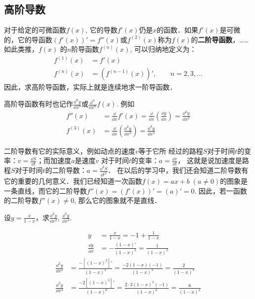 \subsection{高阶导数}
对于给定的可微函数$f(x)$, 它的导数$f'(x)$仍是$x$的函数．如果$f'(x)$是可微的，它的导函数$(f'(x))'=f''(x)$或$f^{(2)}(x)$称为$f(x)$的\textbf{二阶导函数}，……如此类推，$f(x)$
的$n$阶导函数$f^{(n)}(x)$, 可以归纳地定义为：
\begin{align*}
  f ^{(1)} (x)&=f'(x)\\
  f ^{(n)} (x)&=\left(f^{(n-1)}(x)\right)',\qquad n=2,3,\ldots  
\end{align*}
因此，求高阶导函数，实际上就是连续地求一阶导函数．

高阶导函数有时也记作$\frac{\dd^n y}{\dd x^n}$或$\frac{\dd^n }{\dd x^n}f(x)$. 例如
\begin{align*}
    f''(x)&=\frac{\dd}{\dd x}f'(x)=\frac{\dd}{\dd x}\left(\frac{\dd y}{\dd x}\right)=\frac{\dd^2 y}{\dd x^2}\\
    f^{(3)}(x)&=\frac{\dd}{\dd x}\left(\frac{\dd^2 y}{\dd x^2}\right)=\frac{\dd^3 y}{\dd x^3}
\end{align*}

二阶导数有它的实际意义，例如动点的速度$v$等于它所
经过的路程$S$对于时间$t$的变率：$v=\frac{\dd S}{\dd t}$；而加速度$a$是速度$v$
对于时间$t$的变率：$a=\frac{\dd v}{\dd t}$，
这就是说加速度是路程$S$对于时间$t$的二阶导数：$a=\frac{\dd^2 S}{\dd t^2}$．
在以后的学习中，我们还会知道二阶导数有它的重要的几何意义．我们已经知道一次函数$f(x)=ax+b\; (a\ne 0)$的图象是一条直线，而它的二阶导数$f''(x)=(f'(x))'=(a)'=0$. 因此，若一函数的二阶导数$f''(x)\ne 0$, 那么它的图象就不是直线．

\begin{example}
设$y=\frac{x}{1-x}$，求$\frac{\dd^2 y}{\dd x^2}$, $\frac{\dd^3 y}{\dd x^3}$.
\end{example}

\begin{solution}
\begin{align*}
    y&=\frac{x}{1-x}=-1+\frac{1}{1-x}\\
\frac{\dd y}{\dd x}&=-\frac{(1-x)'}{(1-x)^2}=\frac{1}{(1-x)^2}
\end{align*}
\begin{align*}
    \frac{\dd^2 y}{\dd x^2}&=\frac{-[(1-x)^2]'}{(1-x)^4}=\frac{-2(1-x)(-1)}{(1-x)^4}=\frac{2}{(1-x)^3}\\
    \frac{\dd^3 y}{\dd x^3}&=\frac{-2[(1-x)^3]'}{(1-x)^6}=\frac{2\cdot 3(1-x)^2(-1)}{(1-x)^6}=\frac{6}{(1-x)^4}  
\end{align*}
\end{solution}


